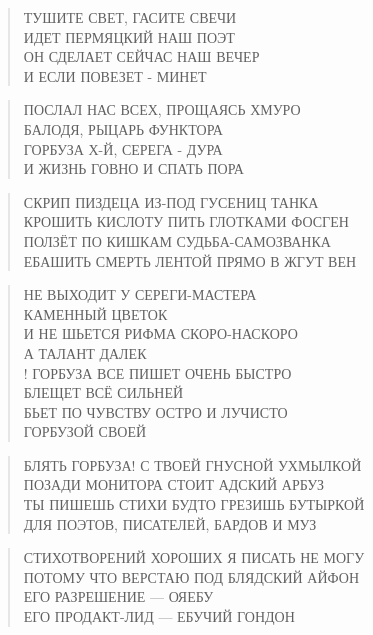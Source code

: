\poemtitle{***}
\begin{verse}
ТУШИТЕ СВЕТ, ГАСИТЕ СВЕЧИ\\
ИДЕТ ПЕРМЯЦКИЙ НАШ ПОЭТ\\
ОН СДЕЛАЕТ СЕЙЧАС НАШ ВЕЧЕР\\
И ЕСЛИ ПОВЕЗЕТ - МИНЕТ
\end{verse}

\poemtitle{***}
\begin{verse}
ПОСЛАЛ НАС ВСЕХ, ПРОЩАЯСЬ ХМУРО\\
БАЛОДЯ, РЫЦАРЬ ФУНКТОРА\\
ГОРБУЗА Х-Й, СЕРЕГА - ДУРА\\
И ЖИЗНЬ ГОВНО И СПАТЬ ПОРА
\end{verse}

\poemtitle{***}
\begin{verse}
СКРИП ПИЗДЕЦА ИЗ-ПОД ГУСЕНИЦ ТАНКА\\
КРОШИТЬ КИСЛОТУ ПИТЬ ГЛОТКАМИ ФОСГЕН\\
ПОЛЗЁТ ПО КИШКАМ СУДЬБА-САМОЗВАНКА\\
ЕБАШИТЬ СМЕРТЬ ЛЕНТОЙ ПРЯМО В ЖГУТ ВЕН
\end{verse}

\poemtitle{***}
\begin{verse}
НЕ ВЫХОДИТ У СЕРЕГИ-МАСТЕРА\\
КАМЕННЫЙ ЦВЕТОК\\
И НЕ ШЬЕТСЯ РИФМА СКОРО-НАСКОРО\\
А ТАЛАНТ ДАЛЕК\\!
ГОРБУЗА ВСЕ ПИШЕТ ОЧЕНЬ БЫСТРО\\
БЛЕЩЕТ ВСЁ СИЛЬНЕЙ\\
БЬЕТ ПО ЧУВСТВУ ОСТРО И ЛУЧИСТО\\
ГОРБУЗОЙ СВОЕЙ
\end{verse}

\poemtitle{***}
\begin{verse}
БЛЯТЬ ГОРБУЗА! С ТВОЕЙ ГНУСНОЙ УХМЫЛКОЙ\\
ПОЗАДИ МОНИТОРА СТОИТ АДСКИЙ АРБУЗ\\
ТЫ ПИШЕШЬ СТИХИ БУДТО ГРЕЗИШЬ БУТЫРКОЙ\\
ДЛЯ ПОЭТОВ, ПИСАТЕЛЕЙ, БАРДОВ И МУЗ
\end{verse}

\poemtitle{***}
\begin{verse}
СТИХОТВОРЕНИЙ ХОРОШИХ Я ПИСАТЬ НЕ МОГУ\\
ПОТОМУ ЧТО ВЕРСТАЮ ПОД БЛЯДСКИЙ АЙФОН\\
ЕГО РАЗРЕШЕНИЕ — ОЯЕБУ\\
ЕГО ПРОДАКТ-ЛИД — ЕБУЧИЙ ГОНДОН
\end{verse}

